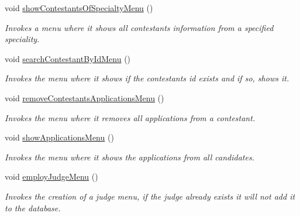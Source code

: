 \begin{DoxyCompactItemize}
void \hyperlink{class_company_m_s_a21c3936cc26b7fbb4fdc4d00cfb5082b}{show\+Contestants\+Of\+Specialty\+Menu} ()
\begin{DoxyCompactList}\small\item\em Invokes a menu where it shows all contestants\textquotesingle{} information from a specified speciality. \end{DoxyCompactList}\item 
\mbox{\label{class_company_m_s_ad2336375a236140627b122b0cd37947e}} 
void \hyperlink{class_company_m_s_ad2336375a236140627b122b0cd37947e}{search\+Contestant\+By\+Id\+Menu} ()
\begin{DoxyCompactList}\small\item\em Invokes the menu where it shows if the contestant\textquotesingle{}s id exists and if so, show\textquotesingle{}s it. \end{DoxyCompactList}\item 
\mbox{\label{class_company_m_s_a513713ab0be9f6db590507db36638cc6}} 
void \hyperlink{class_company_m_s_a513713ab0be9f6db590507db36638cc6}{remove\+Contestants\+Applications\+Menu} ()
\begin{DoxyCompactList}\small\item\em Invokes the menu where it removes all applications from a contestant. \end{DoxyCompactList}\item 
\mbox{\label{class_company_m_s_ad2447b5f8b8a0e7d7b1beb5662674850}} 
void \hyperlink{class_company_m_s_ad2447b5f8b8a0e7d7b1beb5662674850}{show\+Applications\+Menu} ()
\begin{DoxyCompactList}\small\item\em Invokes the menu where it shows the applications from all candidates. \end{DoxyCompactList}\item 
\mbox{\label{class_company_m_s_a8b037b99128fcd555ac70c40dcea568c}} 
void \hyperlink{class_company_m_s_a8b037b99128fcd555ac70c40dcea568c}{employ\+Judge\+Menu} ()
\begin{DoxyCompactList}\small\item\em Invokes the creation of a judge menu, if the judge already exists it will not add it to the database. \end{DoxyCompactList}\item 

\end{DoxyCompactItemize}
